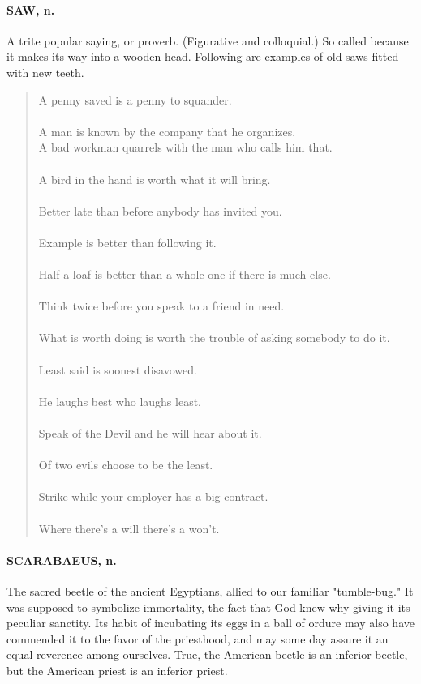 \documentclass[11pt]{article}
\begin{document}
\paragraph{SAW, n.}  A trite popular saying, or proverb.  (Figurative and
colloquial.)  So called because it makes its way into a wooden head.
Following are examples of old saws fitted with new teeth.

\begin{quote}       A penny saved is a penny to squander. \\
 \\
      A man is known by the company that he organizes. \\
      A bad workman quarrels with the man who calls him that. \\
 \\
      A bird in the hand is worth what it will bring. \\
 \\
      Better late than before anybody has invited you. \\
 \\
      Example is better than following it. \\
 \\
      Half a loaf is better than a whole one if there is much else. \\
 \\
      Think twice before you speak to a friend in need. \\
 \\
      What is worth doing is worth the trouble of asking somebody to do it. \\
 \\
      Least said is soonest disavowed. \\
 \\
      He laughs best who laughs least. \\
 \\
      Speak of the Devil and he will hear about it. \\
 \\
      Of two evils choose to be the least. \\
 \\
      Strike while your employer has a big contract. \\
 \\
      Where there's a will there's a won't.  \end{quote}

\paragraph{SCARABAEUS, n.}  The sacred beetle of the ancient Egyptians, allied to
our familiar "tumble-bug."  It was supposed to symbolize immortality,
the fact that God knew why giving it its peculiar sanctity.  Its habit
of incubating its eggs in a ball of ordure may also have commended it
to the favor of the priesthood, and may some day assure it an equal
reverence among ourselves.  True, the American beetle is an inferior
beetle, but the American priest is an inferior priest.
\end{document}
